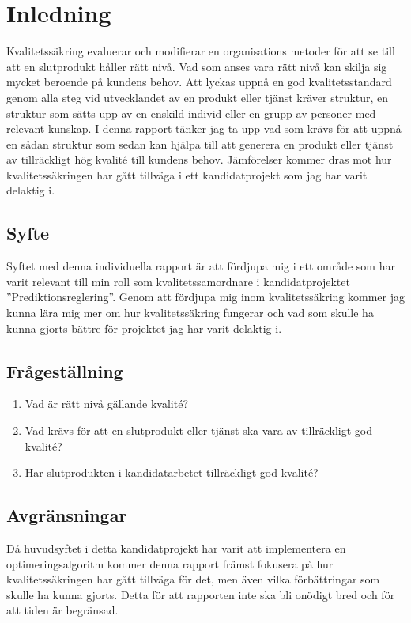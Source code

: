 \section{Inledning}
Kvalitetssäkring evaluerar och modifierar en organisations metoder för att se till att en slutprodukt håller rätt nivå. Vad som anses vara rätt nivå kan skilja sig mycket beroende på kundens behov. 
\newline
\newline
Att lyckas uppnå en god kvalitetsstandard genom alla steg vid utvecklandet av en produkt eller tjänst kräver struktur, en struktur som sätts upp av en enskild individ eller en grupp av personer med relevant kunskap. I denna rapport tänker jag ta upp vad som krävs för att uppnå en sådan struktur som sedan kan hjälpa till att generera en produkt eller tjänst av tillräckligt hög kvalité till kundens behov. Jämförelser kommer dras mot hur kvalitetssäkringen har gått tillväga i ett kandidatprojekt som jag har varit delaktig i.

\subsection{Syfte}
Syftet med denna individuella rapport är att fördjupa mig i ett område som har varit relevant till min roll som kvalitetssamordnare i kandidatprojektet ''Prediktionsreglering''. 
\newline
\newline
Genom att fördjupa mig inom kvalitetssäkring kommer jag kunna lära mig mer om hur kvalitetssäkring fungerar och vad som skulle ha kunna gjorts bättre för projektet jag har varit delaktig i.

\subsection{Frågeställning}

\begin{enumerate}
  \item Vad är rätt nivå gällande kvalité?
  \item Vad krävs för att en slutprodukt eller tjänst ska vara av tillräckligt god kvalité?
  \item Har slutprodukten i kandidatarbetet tillräckligt god kvalité?
\end{enumerate}

\subsection{Avgränsningar}

Då huvudsyftet i detta kandidatprojekt har varit att implementera en optimeringsalgoritm kommer denna rapport främst fokusera på hur kvalitetssäkringen har gått tillväga för det, men även vilka förbättringar som skulle ha kunna gjorts. Detta för att rapporten inte ska bli onödigt bred och för att tiden är begränsad.


